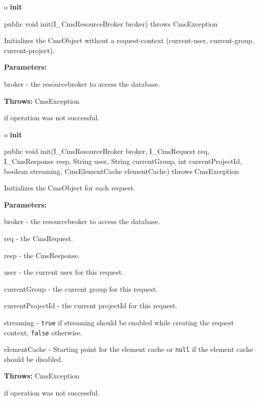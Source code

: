 o {\bf init}

\begin{PRE}
 public void init(I\_CmsResourceBroker broker) throws CmsException
\end{PRE}

\begin{description}
\htmlDD Initializes the CmsObject without a request-context (current-user,
current-group, current-project).

\begin{description}
\item {\bf Parameters:}

broker - the resourcebroker to access the database.
\item {\bf Throws:} CmsException

if operation was not successful.
\end{description}

\end{description}

o {\bf init}

\begin{PRE}
 public void init(I\_CmsResourceBroker broker,
                  I\_CmsRequest req,
                  I\_CmsResponse resp,
                  String user,
                  String currentGroup,
                  int currentProjectId,
                  boolean streaming,
                  CmsElementCache elementCache) throws CmsException
\end{PRE}

\begin{description}
\htmlDD Initializes the CmsObject for each request.

\begin{description}
\item {\bf Parameters:}

broker - the resourcebroker to access the database.

req - the CmsRequest.

resp - the CmsResponse.

user - the current user for this request.

currentGroup - the current group for this request.

currentProjectId - the current projectId for this request.

streaming - {\tt true} if streaming should be enabled while creating the
request context, {\tt false} otherwise.

elementCache - Starting point for the element cache or {\tt null} if the
element cache should be disabled.
\item {\bf Throws:} CmsException

if operation was not successful.
\end{description}

\end{description}

